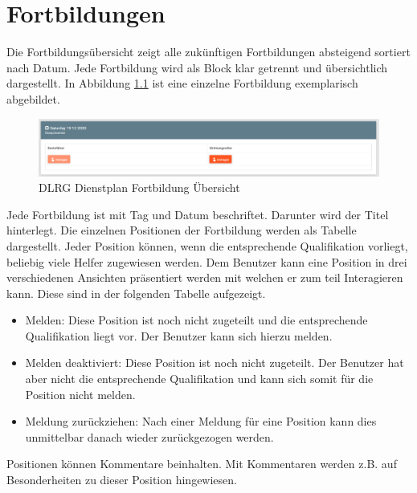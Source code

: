 \chapter{Fortbildungen}
\label{cha:fortbildungen}
Die Fortbildungsübersicht zeigt alle zukünftigen Fortbildungen absteigend sortiert nach Datum. Jede Fortbildung wird als Block klar getrennt und übersichtlich dargestellt. In Abbildung \ref{fig:view_training} \textit{} ist eine einzelne Fortbildung exemplarisch abgebildet.

\begin{figure}[h]
 \begin{addmargin}{-0.2\linewidth}
   \centering 
   \includegraphics[width=20cm]{Bilder/view_training.png}
 \end{addmargin} 
 \caption[Fortbildungen Übersicht]{DLRG Dienstplan Fortbildung Übersicht}
 \label{fig:view_training}
\end{figure}

\noindent Jede Fortbildung ist mit Tag und Datum beschriftet. Darunter wird der Titel hinterlegt. Die einzelnen Positionen der Fortbildung werden als Tabelle dargestellt. Jeder Position können, wenn die entsprechende Qualifikation vorliegt, beliebig viele Helfer zugewiesen werden.
\noindent Dem Benutzer kann eine Position in drei verschiedenen Ansichten präsentiert werden mit welchen er zum teil Interagieren kann.
Diese sind in der folgenden Tabelle aufgezeigt.

\begin{itemize}
\item Melden: Diese Position ist noch nicht zugeteilt und die entsprechende Qualifikation liegt vor. Der Benutzer kann sich hierzu melden.
\item Melden deaktiviert: Diese Position ist noch nicht zugeteilt. Der Benutzer hat aber nicht die entsprechende Qualifikation und kann sich somit für die Position nicht melden.
\item Meldung zurückziehen: Nach einer Meldung für eine Position kann dies unmittelbar danach wieder zurückgezogen werden.
\end{itemize}

\noindent Positionen können Kommentare beinhalten. Mit Kommentaren werden z.B. auf Besonderheiten zu dieser Position hingewiesen.


